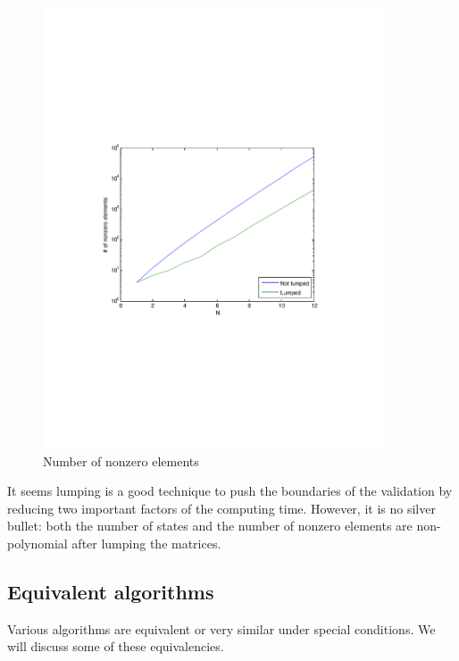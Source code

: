 \documentclass[10pt,a4paper]{article}
\begin{document}
\begin{figure}[h!tb]
\centering
\includegraphics[clip=true, trim=9em 24em 9em 24em, width=0.9\textwidth]{resources/plotlumpingnnz.pdf}
\caption{Number of nonzero elements}
\label{lumpnnz}
\end{figure}

It seems lumping is a good technique to push the boundaries of the validation by reducing two important factors of the computing time. However, it is no silver bullet: both the number of states and the number of nonzero elements are non-polynomial after lumping the matrices.

\subsection{Equivalent algorithms}
Various algorithms are equivalent or very similar under special conditions. We will discuss some of these equivalencies.
\end{document}
